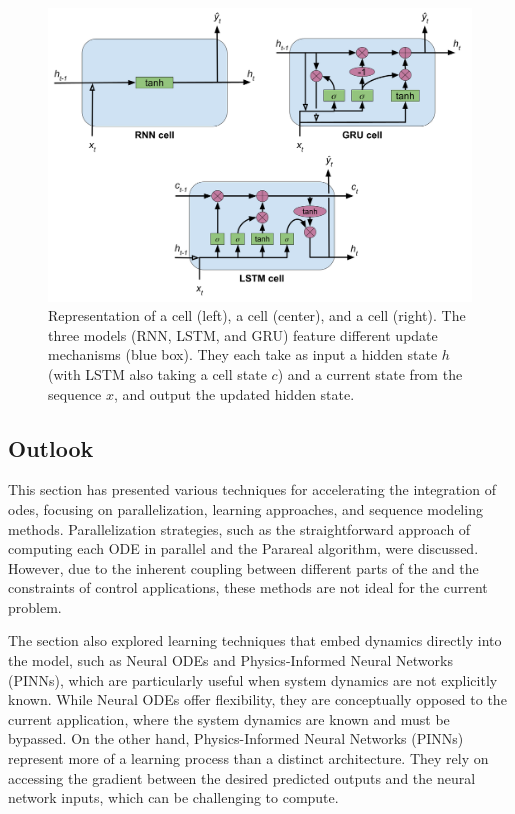 \begin{figure} [htp]
    \centering
    \includegraphics[width=0.8\linewidth]{figures/learning_quadrotor/cells.png}%
    \caption{Representation of a  cell (left), a  cell (center), and a  cell (right).
    The three models (RNN, LSTM, and GRU) feature different update mechanisms (blue box). They each take as input a hidden state $h$ (with LSTM also taking a cell state $c$) and a current state from the sequence $x$, and output the updated hidden state.
    }%
    \label{fig:rnns}%
\end{figure}

\subsection{Outlook}

This section has presented various techniques for accelerating the integration of \gls{odes}, focusing on parallelization, learning approaches, and sequence modeling methods. 
Parallelization strategies, such as the straightforward approach of computing each ODE in parallel and the Parareal algorithm, were discussed. 
However, due to the inherent coupling between different parts of the  and the constraints of control applications, these methods are not ideal for the current problem.

The section also explored learning techniques that embed  dynamics directly into the model, such as Neural ODEs and Physics-Informed Neural Networks (PINNs), which are particularly useful when system dynamics are not explicitly known. 
While Neural ODEs offer flexibility, they are conceptually opposed to the current application, where the system dynamics are known and must be bypassed. 
On the other hand, Physics-Informed Neural Networks (PINNs) represent more of a learning process than a distinct architecture. 
They rely on accessing the gradient between the desired predicted outputs and the neural network inputs, which can be challenging to compute.

